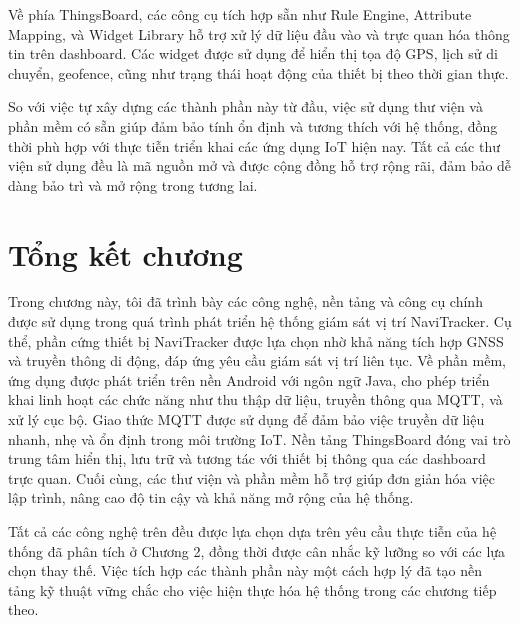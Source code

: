 \documentclass[../DoAn.tex]{subfiles}
\begin{document}
Về phía ThingsBoard, các công cụ tích hợp sẵn như Rule Engine, Attribute Mapping, và Widget Library hỗ trợ xử lý dữ liệu đầu vào và trực quan hóa thông tin trên dashboard. Các widget được sử dụng để hiển thị tọa độ GPS, lịch sử di chuyển, geofence, cũng như trạng thái hoạt động của thiết bị theo thời gian thực.

So với việc tự xây dựng các thành phần này từ đầu, việc sử dụng thư viện và phần mềm có sẵn giúp đảm bảo tính ổn định và tương thích với hệ thống, đồng thời phù hợp với thực tiễn triển khai các ứng dụng IoT hiện nay. Tất cả các thư viện sử dụng đều là mã nguồn mở và được cộng đồng hỗ trợ rộng rãi, đảm bảo dễ dàng bảo trì và mở rộng trong tương lai.
\section{Tổng kết chương}
\label{section:3.6}
Trong chương này, tôi đã trình bày các công nghệ, nền tảng và công cụ chính được sử dụng trong quá trình phát triển hệ thống giám sát vị trí NaviTracker. Cụ thể, phần cứng thiết bị NaviTracker được lựa chọn nhờ khả năng tích hợp GNSS và truyền thông di động, đáp ứng yêu cầu giám sát vị trí liên tục. Về phần mềm, ứng dụng được phát triển trên nền Android với ngôn ngữ Java, cho phép triển khai linh hoạt các chức năng như thu thập dữ liệu, truyền thông qua MQTT, và xử lý cục bộ. Giao thức MQTT được sử dụng để đảm bảo việc truyền dữ liệu nhanh, nhẹ và ổn định trong môi trường IoT. Nền tảng ThingsBoard đóng vai trò trung tâm hiển thị, lưu trữ và tương tác với thiết bị thông qua các dashboard trực quan. Cuối cùng, các thư viện và phần mềm hỗ trợ giúp đơn giản hóa việc lập trình, nâng cao độ tin cậy và khả năng mở rộng của hệ thống.

Tất cả các công nghệ trên đều được lựa chọn dựa trên yêu cầu thực tiễn của hệ thống đã phân tích ở Chương 2, đồng thời được cân nhắc kỹ lưỡng so với các lựa chọn thay thế. Việc tích hợp các thành phần này một cách hợp lý đã tạo nền tảng kỹ thuật vững chắc cho việc hiện thực hóa hệ thống trong các chương tiếp theo.
\end{document}

